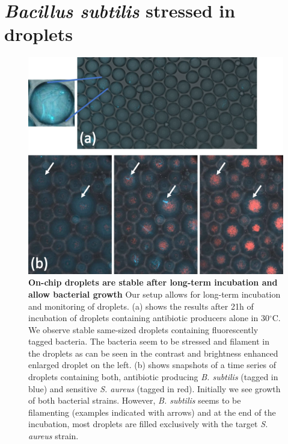 \section{\textit{Bacillus subtilis} stressed in droplets}
\begin{figure}
\centering
\includegraphics[width=\linewidth]{graphics/2025_09_30_droplets_fig8.png}
\caption{\textbf{On-chip droplets are stable after long-term incubation and allow bacterial growth} Our setup allows for long-term incubation and monitoring of droplets. (a) shows the results after 21h of incubation of droplets containing antibiotic producers alone in 30$^\circ$C. We observe stable same-sized droplets containing fluorescently tagged bacteria. The bacteria seem to be stressed and filament in the droplets as can be seen in the contrast and brightness enhanced enlarged droplet on the left. (b) shows snapshots of a time series of droplets containing both, antibiotic producing \textit{B. subtilis} (tagged in blue) and sensitive \textit{S. aureus} (tagged in red). Initially we see growth of both bacterial strains. However, \textit{B. subtilis} seems to be filamenting (examples indicated with arrows) and at the end of the incubation, most droplets are filled exclusively with the target \textit{S. aureus} strain.}
\label{fig:results_incubation_subtilis}
\end{figure}
